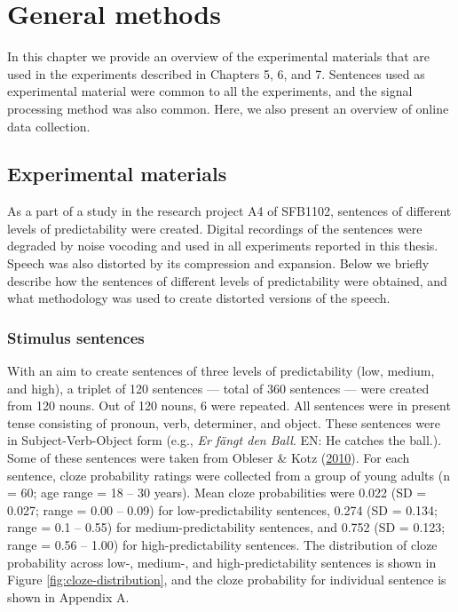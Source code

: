 \documentclass[a4paper, nobind]{templates/ociamthesis}
\renewcommand{\chaptermark}[1]{\markboth{\thechapter. #1}{\thechapter. #1}}
\begin{document}
\hypertarget{chapter-methods}{%
\chapter{General methods}\label{chapter-methods}}

\chaptermark{Methods}

In this chapter we provide an overview of the experimental materials that are used in the experiments described in Chapters 5, 6, and 7.
Sentences used as experimental material were common to all the experiments,
and the signal processing method was also common.
Here, we also present an overview of online data collection.

\hypertarget{experimental-materials}{%
\section{Experimental materials}\label{experimental-materials}}

As a part of a study in the research project A4 of SFB1102, sentences of different levels of predictability were created.
Digital recordings of the sentences were degraded by noise vocoding and used in all experiments reported in this thesis.
Speech was also distorted by its compression and expansion.
Below we briefly describe how the sentences of different levels of predictability were obtained,
and what methodology was used to create distorted versions of the speech.

\hypertarget{stimulus-sentences}{%
\subsection{Stimulus sentences}\label{stimulus-sentences}}

With an aim to create sentences of three levels of predictability (low, medium, and high), a triplet of 120 sentences --- total of 360 sentences --- were created from 120 nouns.
Out of 120 nouns, 6 were repeated.
All sentences were in present tense consisting of pronoun, verb, determiner, and object.
These sentences were in Subject-Verb-Object form (e.g., \emph{Er fängt den Ball}. EN: He catches the ball.).
Some of these sentences were taken from Obleser \& Kotz (\protect\hyperlink{ref-Obleser2010}{2010}).
For each sentence, cloze probability ratings were collected from a group of young adults (n = 60; age range = 18 -- 30 years).
Mean cloze probabilities were 0.022 (SD = 0.027; range = 0.00 -- 0.09) for low-predictability sentences,
0.274 (SD = 0.134; range = 0.1 -- 0.55) for medium-predictability sentences,
and 0.752 (SD = 0.123; range = 0.56 -- 1.00) for high-predictability sentences.
The distribution of cloze probability across low-, medium-, and high-predictability sentences is shown in Figure \ref{fig:cloze-distribution},
and the cloze probability for individual sentence is shown in Appendix A.
\end{document}

